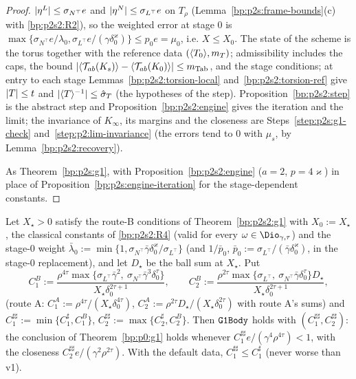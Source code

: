 \begin{proof}
\label{step:p2s2:g1-b}
$\lvert \eta^L\rvert\le\sigma_{N^\top}e$ and $\lvert \eta^N\rvert\le\sigma_{L^\top}e$ on $T_\rho$ (Lemma~\ref{bp:p2s:frame-bounds}(c) with \ref{bp:p2s2:R2}), so the weighted error at stage $0$ is
$\max\{\sigma_{N^\top}e/\lambda_0,\sigma_{L^\top}e/(\gamma\delta_0^\varkappa)\}\le p_0e=\mu_0$, i.e. $X\le X_0$. The state of the scheme is the torus together with the reference
data $(\langle T_0\rangle,m_T)$; admissibility includes the caps, the bound $\lvert \langle \mathcal T_{ab}(K_s)\rangle-\langle \mathcal T_{ab}(K_0)\rangle\rvert\le m_{\mathrm{Tab}}$, and the stage conditions; at
entry to each stage Lemmas~\ref{bp:p2s2:torsion-local} and~\ref{bp:p2s2:torsion-ref} give $\lvert T\rvert\le t$ and $\lvert \langle T\rangle^{-1}\rvert\le\hat\sigma_T$ (the hypotheses of the step).
Proposition~\ref{bp:p2s2:step} is the abstract step and Proposition~\ref{bp:p2s2:engine} gives the iteration and the limit; the invariance of $K_\infty$, its margins and
the closeness are Steps~\ref{step:p2s:g1-check} and~\ref{step:p2:lim-invariance} (the errors tend to $0$ with $\mu_s$, by Lemma~\ref{bp:p2s2:recovery}).

\label{step:p2s2:g1-a}
As Theorem~\ref{bp:p2s:g1}, with Proposition~\ref{bp:p2s2:engine} ($a=2$, $p=4\varkappa$) in place of Proposition~\ref{bp:p2s:engine-iteration} for the stage-dependent constants.
\end{proof}

\begin{corollary}\label{bp:p2s2:frozen-form}
Let $X_\star>0$ satisfy the route-B conditions of Theorem~\ref{bp:p2s2:g1} with $X_0:=X_\star$, the classical constants of \ref{bp:p2s2:R4} (valid for every
$\omega\in\Dio_{\gamma,\tau}$) and the stage-$0$ weight $\bar\lambda_0:=\min\{1,\sigma_{N^\top}\bar\gamma\delta_0^\varkappa/\sigma_{L^\top}\}$ (and $1/\bar p_0$, $\bar p_0:=\sigma_{L^\top}/(\bar\gamma\delta_0^\varkappa)$, in the
stage-$0$ replacement), and let $D_\star$ be the ball sum at $X_\star$. Put
\[
C_1^B:=\frac{\rho^{4\tau}\max\{\sigma_{L^\top}\bar\gamma^2,\ \sigma_{N^\top}\bar\gamma^3\delta_0^\tau\}}{X_\star\delta_0^{2\tau+1}},\qquad
C_2^B:=\frac{\rho^{2\tau}\max\{\sigma_{L^\top},\ \sigma_{N^\top}\bar\gamma\delta_0^\tau\}D_\star}{X_\star\delta_0^{2\tau+1}},
\]
(route A: $C_1^A:=\rho^{4\tau}/(X_\star\delta_0^{4\tau})$, $C_2^A:=\rho^{2\tau}D_\star/(X_\star\delta_0^{2\tau})$ with route A's sums) and $C_1^{\sharp\sharp}:=\min\{C_1^\sharp,C_1^B\}$,
$C_2^{\sharp\sharp}:=\max\{C_2^\sharp,C_2^B\}$. Then $\texttt{G1Body}$ holds with $(C_1^{\sharp\sharp},C_2^{\sharp\sharp})$: the conclusion of Theorem~\ref{bp:p0:g1} holds whenever
$C_1^{\sharp\sharp}e/(\gamma^4\rho^{4\tau})<1$, with the closeness $C_2^{\sharp\sharp}e/(\gamma^2\rho^{2\tau})$. With the default data, $C_1^{\sharp\sharp}\le C_1^\sharp$ (never worse than v1).
\end{corollary}

